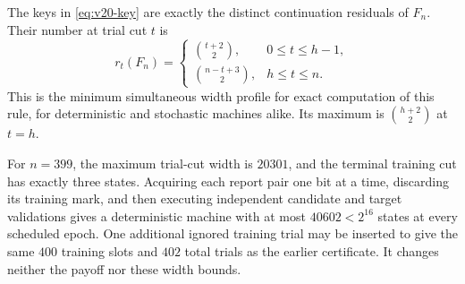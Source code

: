 \begin{theorem}
\label{thm:v20-profile}
The keys in \eqref{eq:v20-key} are exactly the distinct continuation
residuals of $F_n$. Their number at trial cut $t$ is
\begin{equation}\label{eq:v20-profile}
 r_t(F_n)=
 \begin{cases}
  \binom{t+2}{2},&0\le t\le h-1,\\[2pt]
  \binom{n-t+3}{2},&h\le t\le n.
 \end{cases}
\end{equation}
This is the minimum simultaneous width profile for exact computation of
this rule, for deterministic and stochastic machines alike. Its maximum
is $\binom{h+2}{2}$ at $t=h$.

For $n=399$, the maximum trial-cut width is $20301$, and the terminal
training cut has exactly three states. Acquiring each report pair one
bit at a time, discarding its training mark, and then executing independent
candidate and target validations gives a deterministic machine with at
most $40602<2^{16}$ states at every scheduled epoch. One additional
ignored training trial may be inserted to give the same $400$ training
slots and $402$ total trials as the earlier certificate. It changes
neither the payoff nor these width bounds.
\end{theorem}
